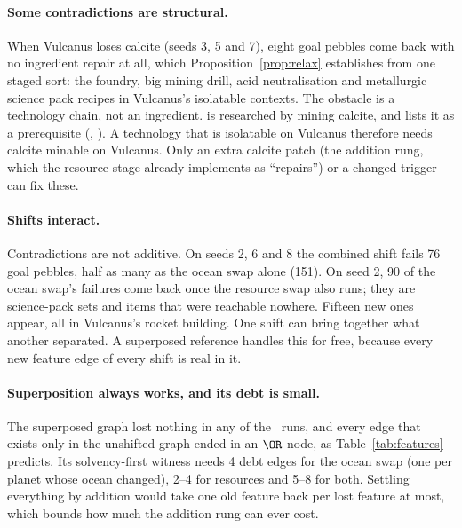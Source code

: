 {\paragraph{Some contradictions are structural.} When Vulcanus loses calcite (seeds 3, 5 and 7), eight goal pebbles come back with no ingredient repair at all, which Proposition~\ref{prop:relax} establishes from one staged sort: the foundry, big mining drill, acid neutralisation and metallurgic science pack recipes in Vulcanus's isolatable contexts. The obstacle is a technology chain, not an ingredient.  is researched by mining calcite, and  lists it as a prerequisite (, ). A technology that is isolatable on Vulcanus therefore needs calcite minable on Vulcanus. Only an extra calcite patch (the addition rung, which the resource stage already implements as ``repairs'') or a changed trigger can fix these.

\paragraph{Shifts interact.} Contradictions are not additive. On seeds 2, 6 and 8 the combined shift fails 76 goal pebbles, half as many as the ocean swap alone (151). On seed 2, 90 of the ocean swap's failures come back once the resource swap also runs; they are science-pack sets and items that were reachable nowhere. Fifteen new ones appear, all in Vulcanus's rocket building. One shift can bring together what another separated. A superposed reference handles this for free, because every new feature edge of every shift is real in it.

\paragraph{Superposition always works, and its debt is small.} The superposed graph lost nothing in any of the \NumRuns\ runs, and every edge that exists only in the unshifted graph ended in an $\OR$ node, as Table~\ref{tab:features} predicts. Its solvency-first witness needs 4 debt edges for the ocean swap (one per planet whose ocean changed), 2--4 for resources and 5--8 for both. Settling everything by addition would take one old feature back per lost feature at most, which bounds how much the addition rung can ever cost.}

\newcommand{\ResultsConflict}{In the measurements, 6 of the 10 ocean repairs and 74 of the 104 combined-shift repairs (over all seeds) are in recipes made in more than one room in vanilla. Today's rule would duplicate all of them. With the context-conflict test, those whose new filler is available wherever the recipe must stay can be edited in place instead.}

